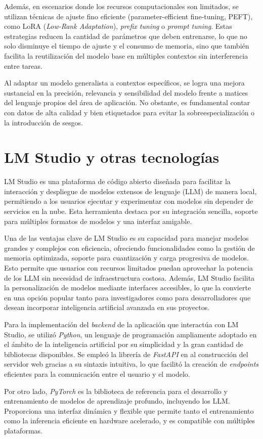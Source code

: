 Además, en escenarios donde los recursos computacionales son limitados,
se utilizan técnicas de ajuste fino eficiente (parameter-efficient fine-tuning, PEFT),
como LoRA (\textit{Low-Rank Adaptation})\cite{hu2021lora},
\textit{prefix tuning}\cite{li2021prefix} o \textit{prompt tuning}.
Estas estrategias reducen la cantidad de parámetros que deben entrenarse,
lo que no solo disminuye el tiempo de ajuste y el consumo de memoria,
sino que también facilita la reutilización del modelo base en múltiples contextos sin interferencia entre tareas.

Al adaptar un modelo generalista a contextos específicos,
se logra una mejora sustancial en la precisión, relevancia y
sensibilidad del modelo frente a matices del lenguaje propios del área de aplicación.
No obstante, es fundamental contar con datos de alta calidad y
bien etiquetados para evitar la sobreespecialización o la introducción de sesgos.

\pagebreak
\section{LM Studio y otras tecnologías}
LM Studio\cite{lmstudio} es una plataforma de código abierto diseñada para facilitar la interacción
y despliegue de modelos extensos de lenguaje (LLM) de manera local,
permitiendo a los usuarios ejecutar y experimentar con modelos sin depender de servicios en la nube.
Esta herramienta destaca por su integración sencilla, soporte para múltiples formatos de modelos y una interfaz amigable.

Una de las ventajas clave de LM Studio es su capacidad para manejar modelos grandes y complejos con eficiencia,
ofreciendo funcionalidades como la gestión de memoria optimizada,
soporte para cuantización y carga progresiva de modelos.
Esto permite que usuarios con recursos limitados puedan aprovechar la potencia de los LLM
sin necesidad de infraestructura costosa.
Además, LM Studio facilita la personalización de modelos mediante interfaces accesibles,
lo que la convierte en una opción popular tanto para investigadores como para desarrolladores
que desean incorporar inteligencia artificial avanzada en sus proyectos.

Para la implementación del \textit{backend} de la aplicación que interactúa con LM Studio, se utilizó \textit{Python},
un lenguaje de programación ampliamente adoptado en el ámbito de la inteligencia artificial por su simplicidad
y la gran cantidad de bibliotecas disponibles.
Se empleó la librería de \textit{FastAPI}\cite{fastapi} en al construcción del servidor web gracias a su sintaxis intuitiva,
lo que facilitó la creación de \textit{endpoints} eficientes para la comunicación entre el usuario y el modelo.

Por otro lado, \textit{PyTorch}\cite{pytorch} es la biblioteca de referencia para el desarrollo 
y entrenamiento de modelos de aprendizaje profundo, incluyendo los LLM.
Proporciona una interfaz dinámica y flexible que permite tanto el entrenamiento
como la inferencia eficiente en hardware acelerado, y es compatible con múltiples plataformas.
